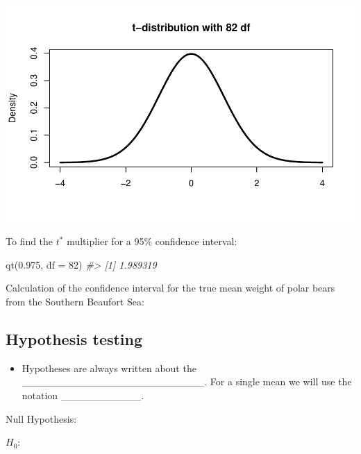 \documentclass[
]{report}
\newenvironment{Shaded}{\begin{snugshade}}{\end{snugshade}}
\newcommand{\AttributeTok}[1]{\textcolor[rgb]{0.77,0.63,0.00}{#1}}
\newcommand{\CommentTok}[1]{\textcolor[rgb]{0.56,0.35,0.01}{\textit{#1}}}
\newcommand{\DecValTok}[1]{\textcolor[rgb]{0.00,0.00,0.81}{#1}}
\newcommand{\FloatTok}[1]{\textcolor[rgb]{0.00,0.00,0.81}{#1}}
\newcommand{\FunctionTok}[1]{\textcolor[rgb]{0.00,0.00,0.00}{#1}}
\newcommand{\NormalTok}[1]{#1}
\providecommand{\tightlist}{%
  \setlength{\itemsep}{0pt}\setlength{\parskip}{0pt}}
\begin{document}
\begin{center}\includegraphics[width=0.7\linewidth]{11-LN011-paired_files/figure-latex/tstarpb-1} \end{center}

\newpage

To find the \(t^*\) multiplier for a 95\% confidence interval:

\begin{Shaded}
\begin{Highlighting}[]
\FunctionTok{qt}\NormalTok{(}\FloatTok{0.975}\NormalTok{, }\AttributeTok{df =} \DecValTok{82}\NormalTok{)}
\CommentTok{\#\textgreater{} [1] 1.989319}
\end{Highlighting}
\end{Shaded}

Calculation of the confidence interval for the true mean weight of polar bears from the Southern Beaufort Sea:

\vspace{0.8in}

\hypertarget{hypothesis-testing-2}{%
\subsection*{Hypothesis testing}\label{hypothesis-testing-2}}


\begin{itemize}
\tightlist
\item
  Hypotheses are always written about the \_\_\_\_\_\_\_\_\_\_\_\_\_\_\_\_\_\_\_\_\_\_\_\_\_. For a single mean we will use the notation \_\_\_\_\_\_\_\_\_\_\_.
\end{itemize}


Null Hypothesis:

\(H_0:\)

\vspace{0.2in}
\end{document}
